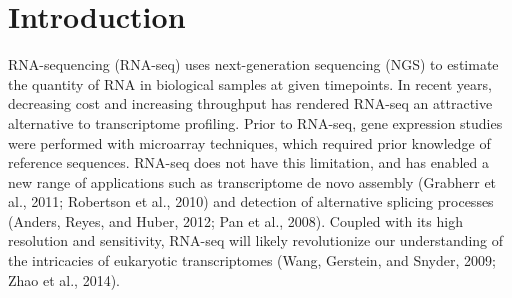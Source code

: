 \documentclass[useAMS,referee]{biom}
\begin{document}
\maketitle


%

\section{Introduction}
\label{s:Introduction}

RNA-sequencing (RNA-seq) uses next-generation sequencing (NGS) to estimate the quantity of RNA in biological samples at given timepoints. In recent years, decreasing cost and increasing throughput has rendered RNA-seq an attractive alternative to transcriptome profiling. Prior to RNA-seq, gene expression studies were performed with microarray techniques, which required prior knowledge of reference sequences. RNA-seq does not have this limitation, and has enabled a new range of applications such as transcriptome de novo assembly (Grabherr et al., 2011; Robertson et al., 2010) and detection of alternative splicing processes (Anders, Reyes, and Huber, 2012; Pan et al., 2008). Coupled with its high resolution and sensitivity, RNA-seq will likely revolutionize our understanding of the intricacies of eukaryotic transcriptomes (Wang, Gerstein, and Snyder, 2009; Zhao et al., 2014).
\end{document}
